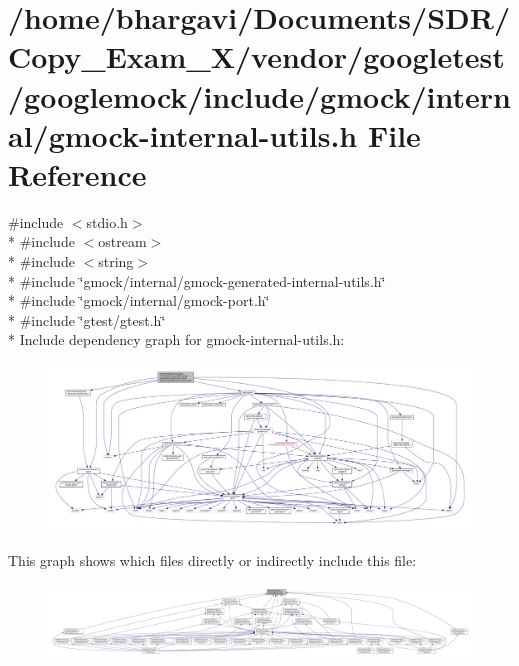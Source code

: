 \hypertarget{gmock-internal-utils_8h}{}\section{/home/bhargavi/\+Documents/\+S\+D\+R/\+Copy\+\_\+\+Exam\+\_\+X/vendor/googletest/googlemock/include/gmock/internal/gmock-\/internal-\/utils.h File Reference}
\label{gmock-internal-utils_8h}
{\ttfamily \#include $<$stdio.\+h$>$}\\*
{\ttfamily \#include $<$ostream$>$}\\*
{\ttfamily \#include $<$string$>$}\\*
{\ttfamily \#include \char`\"{}gmock/internal/gmock-\/generated-\/internal-\/utils.\+h\char`\"{}}\\*
{\ttfamily \#include \char`\"{}gmock/internal/gmock-\/port.\+h\char`\"{}}\\*
{\ttfamily \#include \char`\"{}gtest/gtest.\+h\char`\"{}}\\*
Include dependency graph for gmock-\/internal-\/utils.h\+:
\nopagebreak
\begin{figure}[H]
\begin{center}
\leavevmode
\includegraphics[width=350pt]{gmock-internal-utils_8h__incl}
\end{center}
\end{figure}
This graph shows which files directly or indirectly include this file\+:
\nopagebreak
\begin{figure}[H]
\begin{center}
\leavevmode
\includegraphics[width=350pt]{gmock-internal-utils_8h__dep__incl}
\end{center}
\end{figure}
